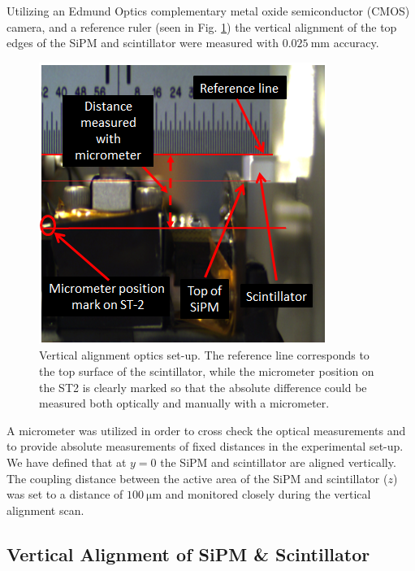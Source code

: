 Utilizing an Edmund Optics complementary metal oxide semiconductor (CMOS) camera, and a reference ruler (seen in Fig. \ref{fig:sipm_va_optics}) the vertical alignment of the top edges of the SiPM and scintillator were measured with $\mathrm{0.025~mm}$ accuracy.
	\begin{figure}[!htb]
		\centering
		\includegraphics[width=1.0\columnwidth]{misalignment/figs/sipm_va_optics}
		\caption{Vertical alignment optics set-up.  The reference line corresponds to the top surface of the scintillator, while the micrometer position on the ST2 is clearly marked so that the absolute difference could be measured both optically and manually with a micrometer.}
		\label{fig:sipm_va_optics}
	\end{figure}
A micrometer was utilized in order to cross check the optical measurements and to provide absolute measurements of fixed distances in the experimental set-up.  We have defined that at $y = 0$ the SiPM and scintillator are aligned vertically.  The coupling distance between the active area of the SiPM and scintillator ($z$) was set to a distance of $\mathrm{100\ \mu m}$ and monitored closely during the vertical alignment scan.

\subsection{Vertical Alignment of SiPM \& Scintillator}
\label{sec:misalign_vert}

